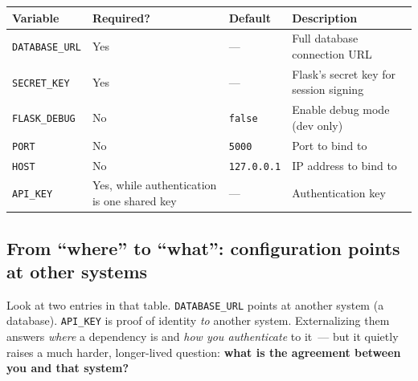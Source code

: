 {\def\LTcaptype{none} %
\begin{longtable}[]{@{}
  >{\raggedright\arraybackslash}p{}
  >{\raggedright\arraybackslash}p{}
  >{\raggedright\arraybackslash}p{}
  >{\raggedright\arraybackslash}p{}@{}}
\toprule\noalign{}
\begin{minipage}[b]{\linewidth}\raggedright
Variable
\end{minipage} & \begin{minipage}[b]{\linewidth}\raggedright
Required?
\end{minipage} & \begin{minipage}[b]{\linewidth}\raggedright
Default
\end{minipage} & \begin{minipage}[b]{\linewidth}\raggedright
Description
\end{minipage} \\
\midrule\noalign{}
\endhead
\bottomrule\noalign{}
\endlastfoot
\texttt{DATABASE\_URL} & Yes & --- & Full database connection URL \\
\texttt{SECRET\_KEY} & Yes & --- & Flask's secret key for session signing \\
\texttt{FLASK\_DEBUG} & No & \texttt{false} & Enable debug mode (dev only) \\
\texttt{PORT} & No & \texttt{5000} & Port to bind to \\
\texttt{HOST} & No & \texttt{127.0.0.1} & IP address to bind to \\
\texttt{API\_KEY} & Yes, while authentication is one shared key & --- & Authentication key \\
\end{longtable}
}

\subsection*{From ``where'' to ``what'': configuration points at other systems}\label{13-configuration-externalization:from-where-to-what-configuration-points-at-other-systems}

Look at two entries in that table. \texttt{DATABASE\_URL} points at another system (a database). \texttt{API\_KEY} is proof of identity \emph{to} another system. Externalizing them answers \emph{where} a dependency is and \emph{how you authenticate} to it~--- but it quietly raises a much harder, longer-lived question: \textbf{what is the agreement between you and that system?}

